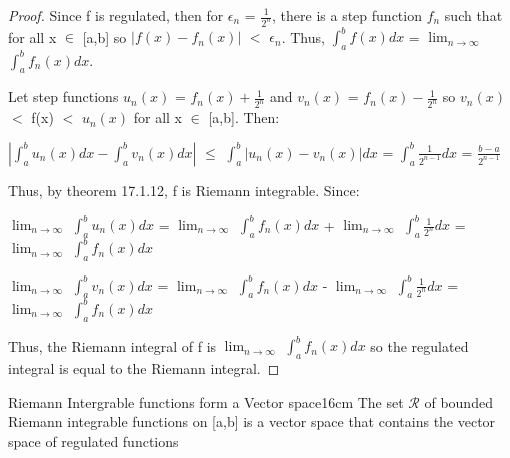     \begin{proof}
        Since f is regulated, then for $\epsilon_n$ = $\frac{1}{2^n}$, there is
        a step function $f_n$ such that for all x $\in$ [a,b] so
        $|f(x) - f_n(x)|$ $<$ $\epsilon_n$.
        Thus, $\int_a^b f(x) dx$
        = $\lim_{n \rightarrow \infty}$ $\int_a^b f_n(x) dx$.

        Let step functions $u_n(x)$ = $f_n(x) + \frac{1}{2^n}$
        and $v_n(x)$ = $f_n(x) - \frac{1}{2^n}$
        so $v_n(x)$ $<$ f(x) $<$ $u_n(x)$ for all x $\in$ [a,b].
        Then:

        \hspace{0.5cm}
        $|\int_a^b u_n(x) dx - \int_a^b v_n(x) dx|$
        $\leq$ $\int_a^b |u_n(x) - v_n(x)| dx$
        = $\int_a^b \frac{1}{2^{n-1}} dx$
        = $\frac{b-a}{2^{n-1}}$

        Thus, by {\color{red} theorem 17.1.12}, f is Riemann integrable. Since:

        \hspace{0.5cm}
        $\lim_{n \rightarrow \infty}$ $\int_a^b u_n(x) dx$
        = $\lim_{n \rightarrow \infty}$ $\int_a^b f_n(x) dx$
            + $\lim_{n \rightarrow \infty}$ $\int_a^b \frac{1}{2^n} dx$
        = $\lim_{n \rightarrow \infty}$ $\int_a^b f_n(x) dx$

        \hspace{0.5cm}
        $\lim_{n \rightarrow \infty}$ $\int_a^b v_n(x) dx$
        = $\lim_{n \rightarrow \infty}$ $\int_a^b f_n(x) dx$
            - $\lim_{n \rightarrow \infty}$ $\int_a^b \frac{1}{2^n} dx$
        = $\lim_{n \rightarrow \infty}$ $\int_a^b f_n(x) dx$

        Thus, the Riemann integral of f is
        $\lim_{n \rightarrow \infty}$ $\int_a^b f_n(x) dx$
        so the regulated integral is equal to the Riemann integral.
    \end{proof}

    \vspace{0.5cm}



    \begin{wtheorem}{Riemann Intergrable functions form a Vector space}{16cm}
        The set $\mathcal{R}$ of bounded Riemann integrable functions on [a,b] is
        a vector space that contains the vector space of regulated
        functions 
    \end{wtheorem}

